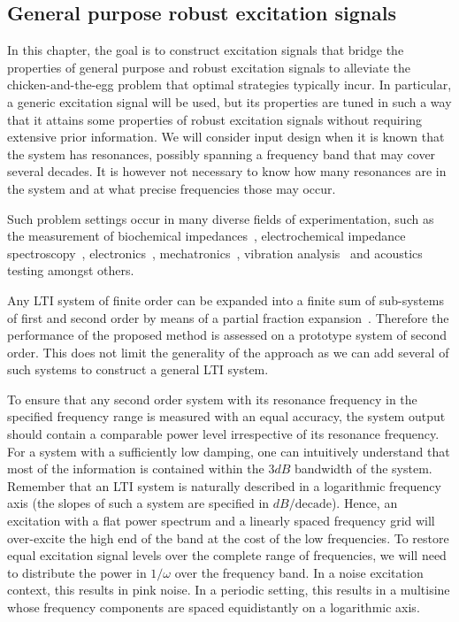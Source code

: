 \subsection{General purpose robust excitation signals}
\label{sec:excitation:intro:approach}
In this chapter, the goal is to construct excitation signals that bridge the properties of general purpose and robust excitation signals to alleviate the chicken-and-the-egg problem that optimal strategies typically incur.
In particular, a generic excitation signal will be used, but its properties are tuned in such a way that it attains some properties of robust excitation signals without requiring extensive prior information.
We will consider input design when it is known that the system has resonances, possibly spanning a frequency band that may cover several decades. 
It is however not necessary to know how many resonances are in the system and at what precise frequencies those may occur.

Such problem settings occur in many diverse fields of experimentation, such as the measurement of biochemical impedances~\citep{Bragos2001,Sanchez2011}, electrochemical impedance spectroscopy~\citep{Niedostatkiewicz2009,VanGheem2004,Breugelmans2010}, electronics~\citep{Munir2011}, mechatronics~\citep{Steinbuch1998,Oomen2016}, vibration analysis~\citep{Karnopp1995,Voorhoeve2015SYSID} and acoustics testing amongst others. %

  Any \gls{LTI} system of finite order can be expanded into a finite sum of sub-systems of first and second order by means of a partial fraction expansion~\citep{Oppenheim1983}.
  Therefore the performance of the proposed method is assessed on a prototype system of second order.
  This does not limit the generality of the approach as we can add several of such systems to construct a general \gls{LTI} system.
  
  To ensure that any second order system with its resonance frequency in the specified frequency range is measured with an equal accuracy, the system output should contain a comparable power level irrespective of its resonance frequency.
  For a system with a sufficiently low damping, one can intuitively understand that most of the information is contained within the $3 \unit{dB}$ bandwidth of the system.
  Remember that an \gls{LTI} system is naturally described in a logarithmic frequency axis (the slopes of such a system are specified in $\unit{dB}/\text{decade}$).
  Hence, an excitation with a flat power spectrum and a linearly spaced frequency grid will over-excite the high end of the band at the cost of the low frequencies.
  To restore equal excitation signal levels over the complete range of frequencies, we will need to distribute the power in $1/\omega$ over the frequency band.
  In a noise excitation context, this results in pink noise.
  In a periodic setting, this results in a multisine whose frequency components are spaced equidistantly on a logarithmic axis.
  
